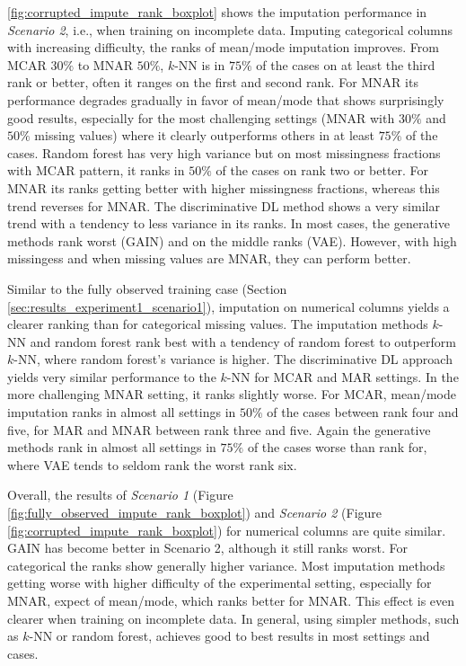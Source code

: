 \autoref{fig:corrupted_impute_rank_boxplot} shows the imputation performance in \textit{Scenario 2}, i.e., when training on incomplete data. Imputing categorical columns with increasing difficulty, the ranks of mean/mode imputation improves. From MCAR $30\%$ to MNAR $50\%$, $k$-NN is in $75\%$ of the cases on at least the third rank or better, often it ranges on the first and second rank. For MNAR its performance degrades gradually in favor of mean/mode that shows surprisingly good results, especially for the most challenging settings (MNAR with $30\%$ and $50\%$ missing values) where it clearly outperforms others in at least $75\%$ of the cases. Random forest has very high variance but on most missingness fractions with MCAR pattern, it ranks in $50\%$ of the cases on rank two or better. For MNAR its ranks getting better with higher missingness fractions, whereas this trend reverses for MNAR. The discriminative DL method shows a very similar trend with a tendency to less variance in its ranks. In most cases, the generative methods rank worst (GAIN) and on the middle ranks (VAE). However, with high missingess and when missing values are MNAR, they can perform better.

Similar to the fully observed training case (Section \ref{sec:results_experiment1_scenario1}), imputation on numerical columns yields a clearer ranking than for categorical missing values. The imputation methods $k$-NN and random forest rank best with a tendency of random forest to outperform $k$-NN, where random forest's variance is higher. The discriminative DL approach yields very similar performance to the $k$-NN for MCAR and MAR settings. In the more challenging MNAR setting, it ranks slightly worse. For MCAR, mean/mode imputation ranks in almost all settings in $50\%$ of the cases between rank four and five, for MAR and MNAR between rank three and five. Again the generative methods rank in almost all settings in $75\%$ of the cases worse than rank for, where VAE tends to seldom rank the worst rank six.

Overall, the results of \textit{Scenario 1} (Figure \ref{fig:fully_observed_impute_rank_boxplot}) and \textit{Scenario 2} (Figure \ref{fig:corrupted_impute_rank_boxplot}) for numerical columns are quite similar. GAIN has become better in Scenario 2, although it still ranks worst. For categorical the ranks show generally higher variance. Most imputation methods getting worse with higher difficulty of the experimental setting, especially for MNAR, expect of mean/mode, which ranks better for MNAR. This effect is even clearer when training on incomplete data. In general, using simpler methods, such as $k$-NN or random forest, achieves good to best results in most settings and cases.


